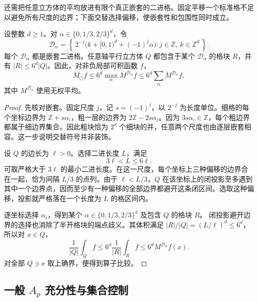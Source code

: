 还需把任意立方体的平均放进有限个真正嵌套的二进格。固定平移一个标准格不足以避免所有尺度的边界；下面交替选择偏移，使嵌套性和包围性同时成立。

\begin{lemma}[有限相邻二进格]
\label{b2:lem:C-adjacent-dyadic}
设整数 \(d\geq1\)。对
\(\alpha\in\{0,1/3,2/3\}^d\)，令
\[
 \mathcal D_\alpha
 =\left\{\,
       2^{-j}\bigl(k+[0,1)^d+(-1)^j\alpha\bigr)
       :j\in\mathbb Z,\ k\in\mathbb Z^d
   \,\right\}.
\]
每个 \(\mathcal D_\alpha\) 都是嵌套二进格。任意轴平行立方体
\(Q\) 都包含于某个 \(\mathcal D_\alpha\) 的格块 \(R\)，并有
\(|R|\leq6^d|Q|\)。因此，对非负局部可积函数 \(f\)，
\[
 M_\mdlgwhtsquare f
       \leq6^d\max_\alpha M^{\mathcal D_\alpha}f
       \leq6^d\sum_\alpha M^{\mathcal D_\alpha}f,
\]
其中 \(M^{\mathcal D_\alpha}\) 使用无权平均。
\end{lemma}
\begin{proof}
先核对嵌套。固定尺度 \(j\)，记 \(s=(-1)^j\)，以
\(2^{-j}\) 为长度单位。细格的每个坐标边界为
\(\mathbb Z+s\alpha_i\)，粗一层的边界为
\(2\mathbb Z-2s\alpha_i\)。因为 \(3s\alpha_i\in\mathbb Z\)，每个粗边界都属于细边界集合。因此粗块恰为 \(2^d\) 个细块的并，任意两个尺度也由逐层嵌套相容。这一步说明交替符号并非装饰。

设 \(Q\) 的边长为 \(\ell>0\)。选择二进长度 \(L\)，满足
\[
 3\ell<L\leq6\ell.
\]
可取严格大于 \(3\ell\) 的最小二进长度。在这一尺度，每个坐标上三种偏移的边界合在一起，恰为间隔 \(L/3\) 的点列。由于 \(\ell<L/3\)，\(Q\) 在该坐标上的闭投影至多遇到其中一个边界点，因而至少有一种偏移的全部边界都避开这条闭区间。选取这种偏移，投影就严格落在一个长度为 \(L\) 的格区间内。

逐坐标选择 \(\alpha_i\)，得到某个
\(\alpha\in\{0,1/3,2/3\}^d\) 及包含 \(Q\) 的格块 \(R\)。
闭投影避开边界的选择也消除了半开格块的端点歧义。其体积满足
\(|R|/|Q|=(L/\ell)^d\leq6^d\)，所以对 \(x\in Q\)，
\[
 \frac1{|Q|}\int_Qf
       \leq6^d\frac1{|R|}\int_Rf
       \leq6^dM^{\mathcal D_\alpha}f(x).
\]
对全部 \(Q\ni x\) 取上确界，便得到算子比较。
\end{proof}

\subsection{一般 \texorpdfstring{\(A_p\)}{Aₚ} 充分性与集合控制}
\label{b2:subsec:C-ap-sufficiency}

